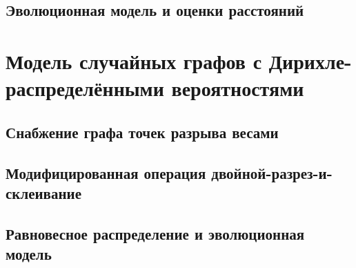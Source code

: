 \subsection{Эволюционная модель и оценки расстояний}
\label{subsec:evolutionary_model_distance}

\section{Модель случайных графов с Дирихле-распределёнными вероятностями}
\label{sec:dirichlet_model}

\subsection{Снабжение графа точек разрыва весами}
\label{subsec:breakpoint_weights}

\subsection{Модифицированная операция двойной-разрез-и-склеивание}
\label{subsec:modified_dcj}

\subsection{Равновесное распределение и эволюционная модель}
\label{subsec:dirichlet_equilibrium}
